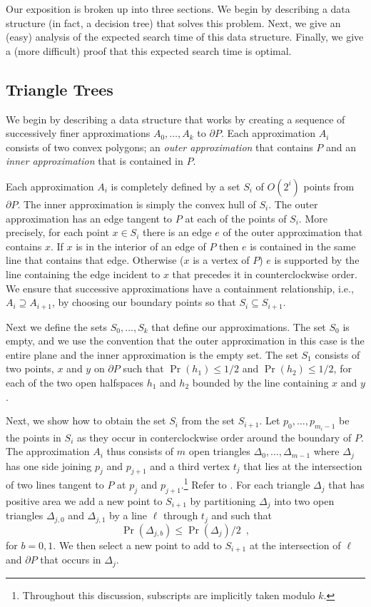 \documentclass[charterfonts,lotsofwhite]{patmorin}
\newcommand{\boundary}{\partial}
\begin{document}
Our exposition is broken up into three sections.  We begin by
describing a data structure (in fact, a decision tree) that solves
this problem.  Next, we give an (easy) analysis of the expected search
time of this data structure.  Finally, we give a (more difficult)
proof that this expected search time is optimal.


\subsection{Triangle Trees}

We begin by describing a data structure that works by creating a
sequence of successively finer approximations $A_0,\ldots,A_k$ to
$\boundary P$.  Each approximation $A_i$ consists of two convex
polygons; an \emph{outer approximation} that contains $P$ and an
\emph{inner approximation} that is contained in $P$.

Each approximation $A_i$ is completely defined by a set $S_i$ of
$O(2^i)$ points from $\boundary P$.  The inner approximation is simply
the convex hull of $S_i$.  The outer approximation has an edge tangent
to $P$ at each of the points of $S_i$.  More precisely, for each point
$x\in S_i$ there is an edge $e$ of the outer approximation that
contains $x$.  If $x$ is in the interior of an edge of $P$ then $e$ is
contained in the same line that contains that edge. Otherwise ($x$ is
a vertex of $P$) $e$ is supported by the line containing the edge
incident to $x$ that precedes it in counterclockwise order.  We ensure
that successive approximations have a containment relationship, i.e.,
$A_i\supseteq A_{i+1}$, by choosing our boundary points so that
$S_i\subseteq S_{i+1}$.

 Next we define the
sets $S_0,\ldots,S_k$ that define our approximations.  The set $S_0$
is empty, and we use the convention that the outer approximation in
this case is the entire plane and the inner approximation is the empty
set. The set $S_1$ consists of two points, $x$ and $y$ on $\boundary
P$ such that $\Pr(h_1)\le 1/2$ and $\Pr(h_2)\le 1/2$, for each of the
two open halfspaces $h_1$ and $h_2$ bounded by the line containing $x$
and $y$.

Next, we show how to obtain the set $S_i$ from the set $S_{i+1}$.  Let
$p_0,\ldots,p_{m_i-1}$ be the points in $S_i$ as they occur in
conterclockwise order around the boundary of $P$.  The approximation
$A_i$ thus consists of $m$ open triangles
$\Delta_0,\ldots,\Delta_{m-1}$ where $\Delta_j$ has one side joining
$p_j$ and $p_{j+1}$ and a third vertex $t_j$ that lies at the
intersection of two lines tangent to $P$ at $p_j$ and
$p_{j+1}$.\footnote{Throughout this discussion, subscripts are
implicitly taken modulo $k$.}  Refer to . For each
triangle $\Delta_j$ that has positive area we add a new point to
$S_{i+1}$  by partitioning $\Delta_j$ into two open triangles
$\Delta_{j,0}$ and $\Delta_{j,1}$ by a line $\ell$ through $t_j$ and
such that 
\[  
     \Pr(\Delta_{j,b}) \le \Pr(\Delta_{j})/2 \enspace ,
\]
for $b=0,1$.
We then select a new point to add to $S_{i+1}$ at the intersection of
$\ell$ and $\boundary P$ that occurs in $\Delta_j$.
\end{document}
